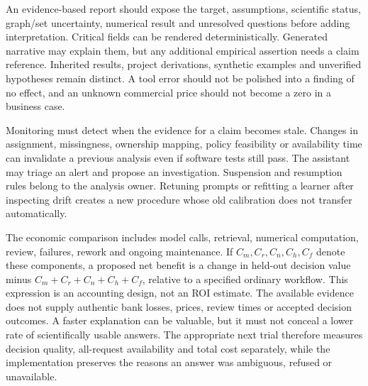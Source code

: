 An evidence-based report should expose the target, assumptions, scientific
status, graph/set uncertainty, numerical result and unresolved questions before
adding interpretation. Critical fields can be rendered deterministically.
Generated narrative may explain them, but any additional empirical assertion
needs a claim reference. Inherited results, project derivations, synthetic
examples and unverified hypotheses remain distinct. A tool error should not be
polished into a finding of no effect, and an unknown commercial price should
not become a zero in a business case.

Monitoring must detect when the evidence for a claim becomes stale. Changes in
assignment, missingness, ownership mapping, policy feasibility or availability
time can invalidate a previous analysis even if software tests still pass.
The assistant may triage an alert and propose an investigation. Suspension and
resumption rules belong to the analysis owner. Retuning prompts or refitting a
learner after inspecting drift creates a new procedure whose old calibration
does not transfer automatically.

The economic comparison includes model calls, retrieval, numerical computation,
review, failures, rework and ongoing maintenance. If $C_m,C_r,C_n,C_h,C_f$ denote
these components, a proposed net benefit is a change in held-out decision value
minus $C_m+C_r+C_n+C_h+C_f$, relative to a specified ordinary workflow.
This expression is an accounting design, not an ROI estimate. The available
evidence does not supply authentic bank losses, prices, review times or accepted
decision outcomes. A faster explanation can be valuable, but it must not conceal
a lower rate of scientifically usable answers. The appropriate next trial
therefore measures decision quality, all-request availability and total cost
separately, while the implementation preserves the reasons an answer was
ambiguous, refused or unavailable.
